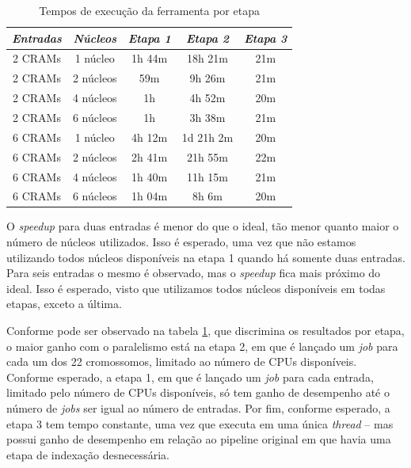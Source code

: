 \documentclass[cic,tc]{iiufrgs}
\begin{document}
\begin{table}[h]
    \caption{Tempos de execução da ferramenta por etapa}
    \centering
        \begin{tabular}{c|c|c|c|c}
          \hline
          \textit{Entradas}  & \textit{Núcleos} & \textit{Etapa 1}  & \textit{Etapa 2} & \textit{Etapa 3} \\
          \hline
          \hline
          2 CRAMs & 1 núcleo  & 1h 44m &    18h 21m & 21m \\
          2 CRAMs & 2 núcleos &    59m &     9h 26m & 21m \\
          2 CRAMs & 4 núcleos & 1h     &     4h 52m & 20m \\
          2 CRAMs & 6 núcleos & 1h     &     3h 38m & 21m \\
          6 CRAMs & 1 núcleo  & 4h 12m & 1d 21h  2m & 20m \\
          6 CRAMs & 2 núcleos & 2h 41m &    21h 55m & 22m \\
          6 CRAMs & 4 núcleos & 1h 40m &    11h 15m & 21m \\
          6 CRAMs & 6 núcleos & 1h 04m &     8h  6m & 20m \\
          \hline
        \end{tabular}
    \label{tbl:stages}
\end{table}

O \textit{speedup} para duas entradas é menor do que o ideal, tão menor quanto
maior o número de núcleos utilizados. Isso é esperado, uma vez que não estamos
utilizando todos núcleos disponíveis na etapa 1 quando há somente duas
entradas. Para seis entradas o mesmo é observado, mas o \textit{speedup} fica
mais próximo do ideal. Isso é esperado, visto que utilizamos todos núcleos
disponíveis em todas etapas, exceto a última.

Conforme pode ser observado na tabela \ref{tbl:stages}, que discrimina os
resultados por etapa, o maior ganho com o paralelismo está na etapa 2, em que é
lançado um \textit{job} para cada um dos 22 cromossomos, limitado ao número de
CPUs disponíveis. Conforme esperado, a etapa 1, em que é lançado um
\textit{job} para cada entrada, limitado pelo número de CPUs disponíveis, só
tem ganho de desempenho até o número de \textit{jobs} ser igual ao número de
entradas. Por fim, conforme esperado, a etapa 3 tem tempo constante, uma vez
que executa em uma única \textit{thread} -- mas possui ganho de desempenho em relação ao
pipeline original em que havia uma etapa de indexação desnecessária.
\end{document}
